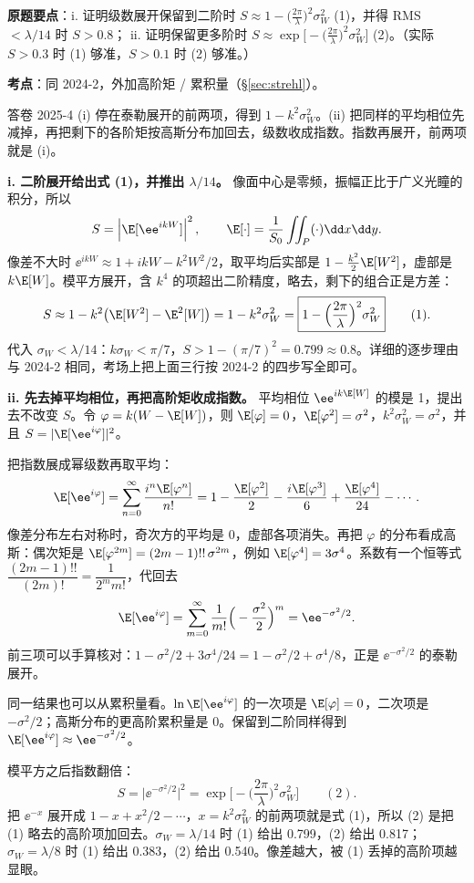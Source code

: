 \noindent\textbf{原题要点}：i. 证明级数展开保留到二阶时 $S\approx1-\big(\frac{2\pi}{\lambda}\big)^2\sigma_W^2$ (1)，并得 RMS $<\lambda/14$ 时 $S>0.8$；
ii. 证明保留更多阶时 $S\approx\exp\big[-\big(\frac{2\pi}{\lambda}\big)^2\sigma_W^2\big]$ (2)。（实际 $S>0.3$ 时 (1) 够准，$S>0.1$ 时 (2) 够准。）

\textbf{考点}：同 2024-2，外加高阶矩 / 累积量（§\ref{sec:strehl}）。

\begin{exam}{答卷 2025-4}
(i) 停在泰勒展开的前两项，得到 $1-k^2\sigma_W^2$。(ii) 把同样的平均相位先减掉，再把剩下的各阶矩按高斯分布加回去，级数收成指数。指数再展开，前两项就是 (i)。

\textbf{i. 二阶展开给出式 (1)，并推出 $\lambda/14$。}
像面中心是零频，振幅正比于广义光瞳的积分，所以
\[
S=\left|\E[\ee^{ikW}]\right|^2,\qquad
\E[\cdot]=\frac1{S_0}\iint_P(\cdot)\dd x\dd y .
\]
像差不大时 $\ee^{ikW}\approx1+ikW-k^2W^2/2$，取平均后实部是 $1-\frac{k^2}{2}\E[W^2]$，虚部是 $k\E[W]$。模平方展开，含 $k^4$ 的项超出二阶精度，略去，剩下的组合正是方差：
\[
S\approx1-k^2\big(\E[W^2]-\E^2[W]\big)=1-k^2\sigma_W^2
=\boxed{1-\Big(\frac{2\pi}{\lambda}\Big)^2\sigma_W^2}\qquad(1).
\]
代入 $\sigma_W<\lambda/14$：$k\sigma_W<\pi/7$，$S>1-(\pi/7)^2=0.799\approx0.8$。详细的逐步理由与 2024-2 相同，考场上把上面三行按 2024-2 的四步写全即可。

\textbf{ii. 先去掉平均相位，再把高阶矩收成指数。}
平均相位 $\ee^{ik\E[W]}$ 的模是 1，提出去不改变 $S$。令 $\varphi=k(W-\E[W])$，则 $\E[\varphi]=0$，$\E[\varphi^2]=\sigma^2$，$k^2\sigma_W^2=\sigma^2$，并且 $S=|\E[\ee^{i\varphi}]|^2$。

把指数展成幂级数再取平均：
\[
\E[\ee^{i\varphi}]=\sum_{n=0}^{\infty}\frac{i^n\E[\varphi^n]}{n!}
=1-\frac{\E[\varphi^2]}{2}-\frac{i\E[\varphi^3]}{6}+\frac{\E[\varphi^4]}{24}-\cdots .
\]
像差分布左右对称时，奇次方的平均是 0，虚部各项消失。再把 $\varphi$ 的分布看成高斯：偶次矩是 $\E[\varphi^{2m}]=(2m-1)!!\,\sigma^{2m}$，例如 $\E[\varphi^4]=3\sigma^4$。系数有一个恒等式 $\dfrac{(2m-1)!!}{(2m)!}=\dfrac{1}{2^m m!}$，代回去
\[
\E[\ee^{i\varphi}]=\sum_{m=0}^{\infty}\frac{1}{m!}\Big(-\frac{\sigma^2}{2}\Big)^m=\ee^{-\sigma^2/2}.
\]
前三项可以手算核对：$1-\sigma^2/2+3\sigma^4/24=1-\sigma^2/2+\sigma^4/8$，正是 $\ee^{-\sigma^2/2}$ 的泰勒展开。

同一结果也可以从累积量看。$\ln\E[\ee^{i\varphi}]$ 的一次项是 $\E[\varphi]=0$，二次项是 $-\sigma^2/2$；高斯分布的更高阶累积量是 0。保留到二阶同样得到 $\E[\ee^{i\varphi}]\approx\ee^{-\sigma^2/2}$。

模平方之后指数翻倍：
\[
S=\big|\ee^{-\sigma^2/2}\big|^2
=\boxed{\exp\Big[-\Big(\frac{2\pi}{\lambda}\Big)^2\sigma_W^2\Big]}\qquad(2).
\]
把 $\ee^{-x}$ 展开成 $1-x+x^2/2-\cdots$，$x=k^2\sigma_W^2$ 的前两项就是式 (1)，所以 (2) 是把 (1) 略去的高阶项加回去。$\sigma_W=\lambda/14$ 时 (1) 给出 0.799，(2) 给出 0.817；$\sigma_W=\lambda/8$ 时 (1) 给出 0.383，(2) 给出 0.540。像差越大，被 (1) 丢掉的高阶项越显眼。
\end{exam}

